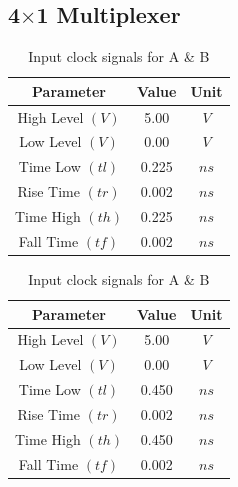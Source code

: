 \documentclass[a4paper,12pt]{article}
\begin{document}
	\subsection{4$\times$1 Multiplexer}
	
	
	\begin{table}[H]
		\centering
		\caption{Parameters of Input Clock Signals for A,B,C,D S0, S0bar, S1 \& S1bar}
		\begin{subtable}[t]{0.48\textwidth} %
			\centering
			\begin{tabular}{|c|c|c|}
				\hline
				\textbf{Parameter}          & \textbf{Value} & \textbf{Unit} \\ \hline
				High Level $(V)$            & 5.00           & $V$           \\ \hline
				Low Level $(V)$             & 0.00           & $V$           \\ \hline
				Time Low $(tl)$             & 0.225          & $ns$          \\ \hline
				Rise Time $(tr)$            & 0.002          & $ns$          \\ \hline
				Time High $(th)$            & 0.225          & $ns$          \\ \hline
				Fall Time $(tf)$            & 0.002          & $ns$          \\ \hline
			\end{tabular}
			\caption{Input clock signals for A \& B} %
		\end{subtable}
		\hfil
		\begin{subtable}[t]{0.48\textwidth} %
			\centering
			\begin{tabular}{|c|c|c|}
				\hline
				\textbf{Parameter}          & \textbf{Value} & \textbf{Unit} \\ \hline
				High Level $(V)$            & 5.00           & $V$           \\ \hline
				Low Level $(V)$             & 0.00           & $V$           \\ \hline
				Time Low $(tl)$             & 0.450        & $ns$          \\ \hline
				Rise Time $(tr)$            & 0.002          & $ns$          \\ \hline
				Time High $(th)$            & 0.450          & $ns$          \\ \hline
				Fall Time $(tf)$            & 0.002          & $ns$          \\ \hline

\end{tabular}
\end{subtable}
\end{table}
\end{document}
